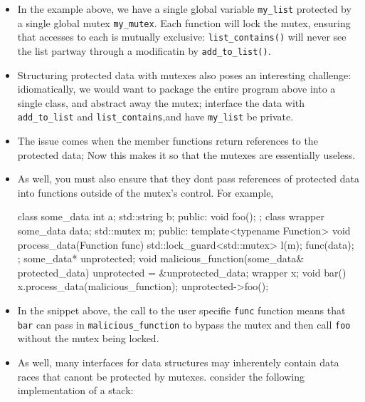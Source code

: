 \documentclass[11pt, a4paper]{article}
\theoremstyle{definition}
\theoremstyle{remark}
\newcommand{\code}[1]{\lstinline|#1|}
\begin{document}
\begin{itemize}
\newpage
\begin{cppcode}
#include <list>
#include <mutex>
#include <algorithm>

std::list<int> my_list;
std::mutex my_mutex;
void add_to_list(int new_value) {
    std::lock_guard<std::mutex> guard(my_mutex);
    my_list.push_back(new_value);
}
bool list_contains(int value_to_find) {
    std::lock_guard<std::mutex> guard(my_mutex);
    return std::find(my_list.begin(), my_list.end(), value_to_find) != my_list.end();
}
\end{cppcode}
    \item In the example above, we have a single global variable \code{my_list} protected by a single global mutex \code{my_mutex}. Each function will lock the mutex, ensuring that accesses to each is mutually exclusive: \code{list_contains()} will never see the list partway through a modificatin by \code{add_to_list()}.
    \item Structuring protected data with mutexes also poses an interesting challenge: idiomatically, we would want to package the entire program above into a single class, and abstract away the mutex; interface the data with \code{add_to_list} and \code{list_contains},and have \code{my_list} be private. 
    \item The issue comes when the member functions return references to the protected data; Now this makes it so that the mutexes are essentially useless.
    \item As well, you must also ensure that they dont pass references of protected data into functions outside of the mutex's control. For example,
\begin{cppcode}
class some_data {
    int a; 
    std::string b;
public:
    void foo();
};
class wrapper {
    some_data data;
    std::mutex m;
public:
    template<typename Function>
    void process_data(Function func) {
        std::lock_guard<std::mutex> l(m);
        func(data);
    }
};
some_data* unprotected;
void malicious_function(some_data& protected_data) {
    unprotected = &unprotected_data;
}
wrapper x;
void bar() {
    x.process_data(malicious_function);
    unprotected->foo();
}
\end{cppcode}
    \item In the snippet above, the call to the user specifie \code{func} function means that \code{bar} can pass in \code{malicious_function} to bypass the mutex and then call \code{foo} without the mutex being locked.
    \item As well, many interfaces for data structures may inherentely contain data races that canont be protected by mutexes. consider the following implementation of a stack:

\end{itemize}
\end{document}
